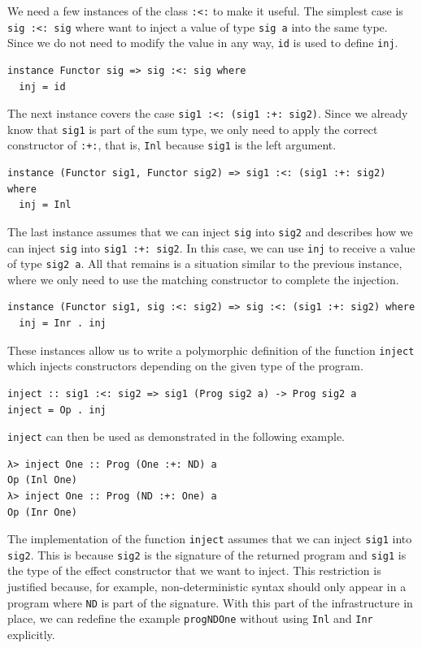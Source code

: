 \documentclass[a4paper, 11pt, fleqn, twoside]{scrreprt}
\newcommand{\hinl}[1]{\texttt{#1}}
\begin{document}
We need a few instances of the class \hinl{:<:} to make it useful.
The simplest case is \hinl{sig :<: sig} where want to inject a value of type \hinl{sig a} into the same type.
Since we do not need to modify the value in any way, \hinl{id} is used to define \hinl{inj}.

\begin{verbatim}
instance Functor sig => sig :<: sig where
  inj = id  
\end{verbatim}

The next instance covers the case \hinl{sig1 :<: (sig1 :+: sig2)}.
Since we already know that \hinl{sig1} is part of the sum type, we only need to apply the correct constructor of \hinl{:+:}, that is, \hinl{Inl} because \hinl{sig1} is the left argument.

\begin{verbatim}
instance (Functor sig1, Functor sig2) => sig1 :<: (sig1 :+: sig2) where
  inj = Inl
\end{verbatim}

The last instance assumes that we can inject \hinl{sig} into \hinl{sig2} and describes how we can inject \hinl{sig} into \hinl{sig1 :+: sig2}.
In this case, we can use \hinl{inj} to receive a value of type \hinl{sig2 a}.
All that remains is a situation similar to the previous instance, where we only need to use the matching constructor to complete the injection.
 
\begin{verbatim}
instance (Functor sig1, sig :<: sig2) => sig :<: (sig1 :+: sig2) where
  inj = Inr . inj
\end{verbatim}

These instances allow us to write a polymorphic definition of the function \hinl{inject} which injects constructors depending on the given type of the program.

\begin{verbatim}
inject :: sig1 :<: sig2 => sig1 (Prog sig2 a) -> Prog sig2 a
inject = Op . inj
\end{verbatim}

\hinl{inject} can then be used as demonstrated in the following example.

\begin{verbatim}
λ> inject One :: Prog (One :+: ND) a
Op (Inl One)
λ> inject One :: Prog (ND :+: One) a
Op (Inr One)
\end{verbatim}

The implementation of the function \hinl{inject} assumes that we can inject \hinl{sig1} into \hinl{sig2}.
This is because \hinl{sig2} is the signature of the returned program and \hinl{sig1} is the type of the effect constructor that we want to inject.
This restriction is justified because, for example, non-deterministic syntax should only appear in a program where \hinl{ND} is part of the signature.
With this part of the infrastructure in place, we can redefine the example \hinl{progNDOne} without using \hinl{Inl} and \hinl{Inr} explicitly.
\end{document}
